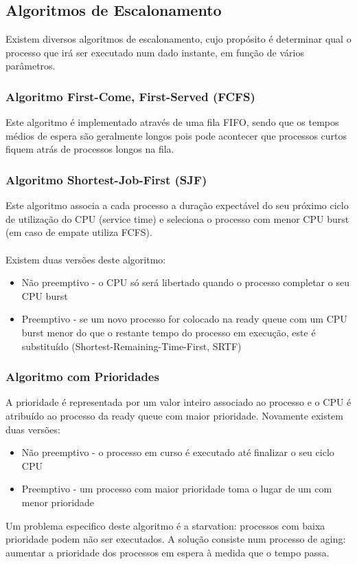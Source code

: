 \documentclass[10pt,a4paper]{report}
\begin{document}
\subsection{Algoritmos de Escalonamento}
Existem diversos algoritmos de escalonamento, cujo propósito é determinar qual o processo que irá ser executado num dado instante, em função de vários parâmetros.
\subsubsection{Algoritmo First-Come, First-Served (FCFS)}
Este algoritmo é implementado através de uma fila FIFO, sendo que os tempos médios de espera são geralmente longos pois pode acontecer que processos curtos fiquem atrás de processos longos na fila.
\subsubsection{Algoritmo Shortest-Job-First (SJF)}
Este algoritmo associa a cada processo a duração expectável do seu próximo ciclo de utilização do CPU (service time) e seleciona o processo com menor CPU burst (em caso de empate utiliza FCFS).\\
\\
Existem duas versões deste algoritmo:
\begin{itemize}
\item Não preemptivo - o CPU só será libertado quando o processo completar o seu CPU burst
\item Preemptivo - se um novo processo for colocado na ready queue com um CPU burst menor do que o restante tempo do processo em execução, este é substituído (Shortest-Remaining-Time-First, SRTF)
\end{itemize}
\subsubsection{Algoritmo com Prioridades}
A prioridade é representada por um valor inteiro associado ao processo e o CPU é atribuído ao processo da ready queue com maior prioridade. Novamente existem duas versões:
\begin{itemize}
\item Não preemptivo - o processo em curso é executado até finalizar o seu ciclo CPU
\item Preemptivo - um processo com maior prioridade toma o lugar de um com menor prioridade
\end{itemize}
Um problema especifico deste algoritmo é a starvation: processos com baixa prioridade podem não ser executados. A solução consiste num processo de aging: aumentar a prioridade dos processos em espera à medida que o tempo passa.
\end{document}
